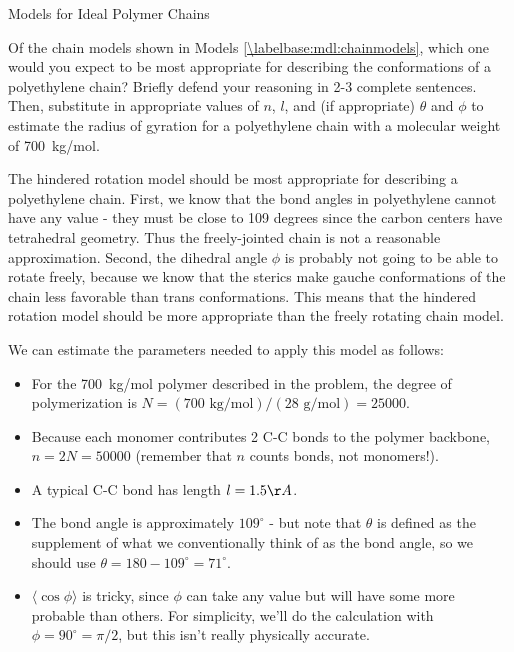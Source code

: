 \begin{activity}{Models for Ideal Polymer Chains}
\begin{ctqs}
\end{ctqs}

	
\clearpage
\begin{exercises}
	\exercise Of the chain models shown in Models \ref{\labelbase:mdl:chainmodels}, which one would you expect to be most appropriate for describing the conformations of a polyethylene chain?  Briefly defend your reasoning in 2-3 complete sentences.  Then, substitute in appropriate values of $n$, $l$, and (if appropriate) $\theta$ and $\phi$ to estimate the radius of gyration for a polyethylene chain with a molecular weight of 700~kg/mol.
	
		\begin{solution}{}
			The hindered rotation model should be most appropriate for describing a polyethylene chain.  First, we know that the bond angles in polyethylene cannot have any value - they must be close to 109 degrees since the carbon centers have tetrahedral geometry.  Thus the freely-jointed chain is not a reasonable approximation.  Second, the dihedral angle $\phi$ is probably not going to be able to rotate freely, because we know that the sterics make gauche conformations of the chain less favorable than trans conformations.    This means that the hindered rotation model should be more appropriate than the freely rotating chain model.
			
			We can estimate the parameters needed to apply this model as follows:
			\begin{itemize}
				\item For the 700~kg/mol polymer described in the problem, the degree of polymerization is $N = (700\text{ kg/mol})/(28\text{ g/mol}) = 25000$.  
				\item Because each monomer contributes 2 C-C bonds to the polymer backbone, $n=2N=50000$ (remember that $n$ counts bonds, not monomers!).  
				\item A typical C-C bond has length $l=1.5\AA$. 
				\item The bond angle is approximately $109^\circ$ - but note that $\theta$ is defined as the supplement of what we conventionally think of as the bond angle, so we should use $\theta=180-109^\circ = 71^\circ$.  
				\item $\langle \cos \phi\rangle$ is tricky, since $\phi$ can take any value but will have some more probable than others. For simplicity, we'll do the calculation with $\phi=90^\circ = \pi/2$, but this isn't really physically accurate.
			\end{itemize}
			

\end{solution}
\end{exercises}
\end{activity}

